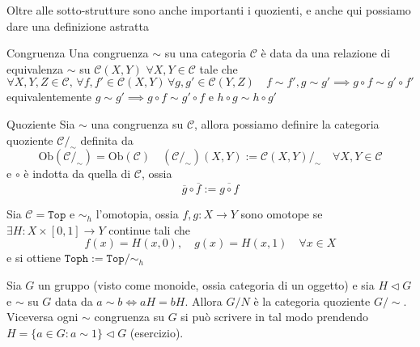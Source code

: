 Oltre alle sotto-strutture sono anche importanti i quozienti, e anche qui
possiamo dare una definizione astratta

\begin{definition}{Congruenza}
    Una congruenza \(\sim \) su una categoria \(\mathcal{\mathcal{C}}\) è data da una relazione di
    equivalenza \(\sim \) su \(\mathcal{\mathcal{C}}{(X, Y)}\) \(\forall X, Y \in \mathcal{\mathcal{C}}\) tale che
    \[
      \forall X, Y, Z \in \mathcal{\mathcal{C}}, \, \forall f, f' \in \mathcal{\mathcal{C}}{(X, Y)} \, \forall g,
      g' \in \mathcal{\mathcal{C}}{(Y, Z)} \quad f \sim f', g \sim g' \implies g \circ f \sim g'
      \circ f'
    \]
    equivalentemente \(g \sim g' \implies g \circ f \sim g' \circ f\) e \(h \circ g \sim h \circ g'\) 
\end{definition}

\begin{definition}{Quoziente}
    Sia \(\sim \) una congruenza su \(\mathcal{\mathcal{C}}\), allora possiamo definire la categoria
    quoziente \(\mathcal{\mathcal{C}} /_\sim \) definita da
    \[
      \mathrm{Ob}{(\mathcal{\mathcal{C}} /_\sim )} = \mathrm{Ob}{(\mathcal{\mathcal{C}})} \quad {(\mathcal{\mathcal{C}} /_\sim )}{(X, Y)} :=
      \mathcal{\mathcal{C}}{(X, Y)} /_\sim \quad \forall X, Y \in \mathcal{\mathcal{C}}
    \]
    e \(\circ\) è indotta da quella di \(\mathcal{\mathcal{C}}\), ossia
    \[
      \overline{g} \circ \overline{f} := \overline{g \circ f}
    \]
\end{definition}

\begin{example}[Omotopia]
    Sia \(\mathcal{\mathcal{C}} = \mathtt{Top}\) e \(\sim_h \) l'omotopia, ossia \(f, g : X \to Y\)
    sono omotope se \(\exists  H : X \times [0, 1] \to Y\) continue tali che 
    \[
      f{(x)} = H{(x, 0)}, \quad g{(x)} = H{(x, 1)} \quad \forall x \in X
    \]
    e si ottiene \(\mathtt{Toph} := \mathtt{Top} / \sim_h \) 
\end{example}

\begin{example}
    Sia \(G\) un gruppo (visto come monoide, ossia categoria di un oggetto) e
    sia \(H \vartriangleleft G\) e \(\sim \) su \(G\) data da \(a \sim b \iff aH
    = bH\). Allora \(G/N\) è la categoria quoziente \(G / \sim \).
    Viceversa ogni \(\sim \) congruenza su \(G\) si può scrivere in tal
    modo prendendo \(H = \{a \in G : a \sim 1\} \vartriangleleft G \) (esercizio).
\end{example}

